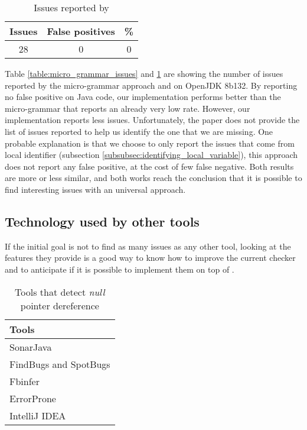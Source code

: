 \begin{table}[h]
	\centering
	\caption{Issues reported by \slang{}}
	\label{table:slang_issues_jdk8}
	\begin{tabular}{|c|c|c|}
		\hline
		\bf Issues & \bf False positives & \bf \% \\ \hline
		28 &  0 &  0 \\ \hline
	\end{tabular}
\end{table}

Table \ref{table:micro_grammar_issues} and \ref{table:slang_issues_jdk8} are showing the number of issues reported by the micro-grammar approach and \slang{} on OpenJDK 8b132.
By reporting no false positive on Java code, our implementation performs better than the micro-grammar that reports an already very low rate.
However, our implementation reports less issues.
Unfortunately, the paper does not provide the list of issues reported to help us identify the one that we are missing.
One probable explanation is that we choose to only report the issues that come from local identifier (subsection \ref{subsubsec:identifying_local_variable}), this approach does not report any false positive, at the cost of few false negative.
Both results are more or less similar, and both works reach the conclusion that it is possible to find interesting issues with an universal approach.

\subsection{Technology used by other tools}
\label{subsec:other_tools_technology}

If the initial goal is not to find as many issues as any other tool, looking at the features they provide is a good way to know how to improve the current checker and to anticipate if it is possible to implement them on top of \slang{}.

\begin{table}[h]
	\centering
	\caption{Tools that detect \emph{null} pointer dereference}
	\label{table:tools_features}
	\begin{tabular}{|l|}
		\hline
		\bf Tools \\
		\hline
		SonarJava \cite{SonarJava:2019:Online} \\
		FindBugs \cite{Hovemeyer:2004:FBE:1052883.1052895} and SpotBugs \cite{spotBugs:2019:Online} \\
		Fbinfer \cite{fbInfer:2019:Online} \\
		ErrorProne \cite{errorProne:2019:Online} \\
		IntelliJ IDEA \cite{intelJIDEA:2019:Online} \\
		\hline    
	\end{tabular}
\end{table}

